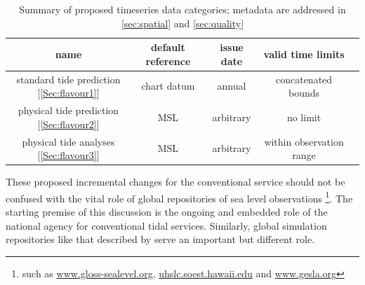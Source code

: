 \begin{table}[H]\centering
    \begin{tabular}{ |c|c|c|c|c| }
    \hline
    name    & 
        default reference  & 
        issue date         & 
        valid time limits  \\
    \hline
    standard tide prediction [\ref{Sec:flavour1}] & 
        chart datum & annual & 
        concatenated bounds\\
    \hline
    physical tide prediction [\ref{Sec:flavour2}]& 
        MSL       & 
        arbitrary & 
        no limit \\
    \hline
    physical tide analyses [\ref{Sec:flavour3}]& 
        MSL       & 
        arbitrary & 
        within observation range \\
    \hline
    \end{tabular}
    \caption{Summary of proposed timeseries data categories; metadata are addressed in \ref{sec:spatial} and \ref{sec:quality} }
    \label{tab:typesSummary}
\end{table}
These proposed incremental changes for the conventional service should not be confused with the vital role of global repositories of sea level observations \footnote{such as \url{www.gloss-sealevel.org}, \url{uhslc.soest.hawaii.edu} and \url{www.gesla.org}}.    The starting premise of this discussion is the ongoing and embedded role of the national agency for conventional tidal services.    
Similarly, global simulation repositories like that described by \citeauthor{10.3389/fmars.2020.00263}
serve an important but different role.

